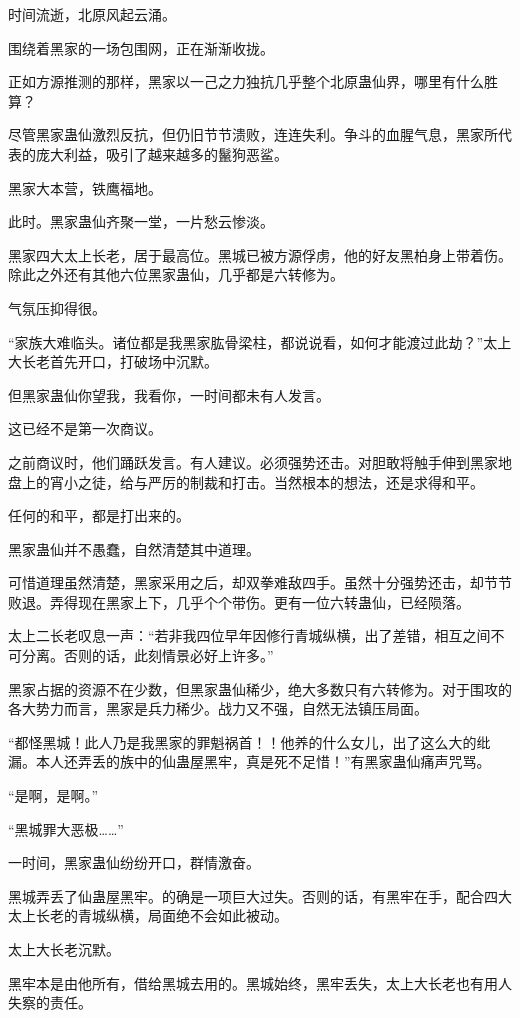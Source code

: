 \begin{this_body}
时间流逝，北原风起云涌。

围绕着黑家的一场包围网，正在渐渐收拢。

正如方源推测的那样，黑家以一己之力独抗几乎整个北原蛊仙界，哪里有什么胜算？

尽管黑家蛊仙激烈反抗，但仍旧节节溃败，连连失利。争斗的血腥气息，黑家所代表的庞大利益，吸引了越来越多的鬣狗恶鲨。

黑家大本营，铁鹰福地。

此时。黑家蛊仙齐聚一堂，一片愁云惨淡。

黑家四大太上长老，居于最高位。黑城已被方源俘虏，他的好友黑柏身上带着伤。除此之外还有其他六位黑家蛊仙，几乎都是六转修为。

气氛压抑得很。

“家族大难临头。诸位都是我黑家肱骨梁柱，都说说看，如何才能渡过此劫？”太上大长老首先开口，打破场中沉默。

但黑家蛊仙你望我，我看你，一时间都未有人发言。

这已经不是第一次商议。

之前商议时，他们踊跃发言。有人建议。必须强势还击。对胆敢将触手伸到黑家地盘上的宵小之徒，给与严厉的制裁和打击。当然根本的想法，还是求得和平。

任何的和平，都是打出来的。

黑家蛊仙并不愚蠢，自然清楚其中道理。

可惜道理虽然清楚，黑家采用之后，却双拳难敌四手。虽然十分强势还击，却节节败退。弄得现在黑家上下，几乎个个带伤。更有一位六转蛊仙，已经陨落。

太上二长老叹息一声：“若非我四位早年因修行青城纵横，出了差错，相互之间不可分离。否则的话，此刻情景必好上许多。”

黑家占据的资源不在少数，但黑家蛊仙稀少，绝大多数只有六转修为。对于围攻的各大势力而言，黑家是兵力稀少。战力又不强，自然无法镇压局面。

“都怪黑城！此人乃是我黑家的罪魁祸首！！他养的什么女儿，出了这么大的纰漏。本人还弄丢的族中的仙蛊屋黑牢，真是死不足惜！”有黑家蛊仙痛声咒骂。

“是啊，是啊。”

“黑城罪大恶极……”

一时间，黑家蛊仙纷纷开口，群情激奋。

黑城弄丢了仙蛊屋黑牢。的确是一项巨大过失。否则的话，有黑牢在手，配合四大太上长老的青城纵横，局面绝不会如此被动。

太上大长老沉默。

黑牢本是由他所有，借给黑城去用的。黑城始终，黑牢丢失，太上大长老也有用人失察的责任。


\end{this_body}
